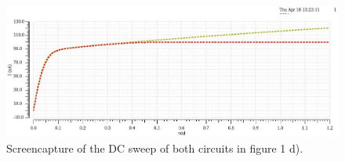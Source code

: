 \documentclass[onecolumn]{article}
\begin{document}
\begin{figure}[h!]
    \centering
    \includegraphics[width=1\textwidth]{plot_circuit_d_dc_sweep_omskjert.jpg}
    \caption{Screencapture of the DC sweep of both circuits in figure 1 d).}
    \label{fig:plotd}
\end{figure}
\end{document}
